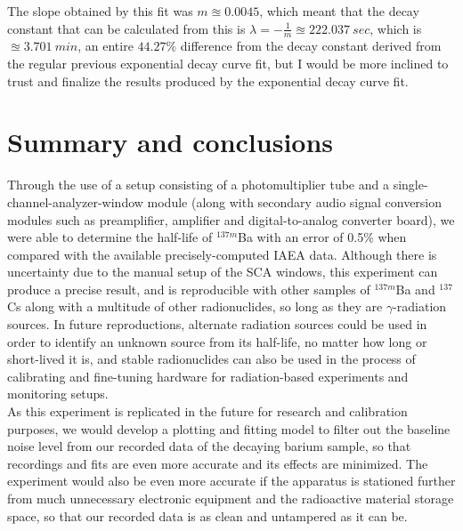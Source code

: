 \documentclass[10pt,letterpaper,onecolumn]{article}
\begin{document}
The slope obtained by this fit was $m \approxeq 0.0045$, which meant that the decay constant that can be calculated from this is $\lambda = -\frac{1}{m} \approxeq 222.037\ sec$, which is $\approxeq 3.701\ min$, an entire $44.27\%$ difference from the decay constant derived from the regular previous exponential decay curve fit, but I would be more inclined to trust and finalize the results produced by the exponential decay curve fit.


\section{Summary and conclusions}

Through the use of a setup consisting of a photomultiplier tube and a single-channel-analyzer-window module (along with secondary audio signal conversion modules such as preamplifier, amplifier and digital-to-analog converter board), we were able to determine the half-life of $^{137m}$Ba with an error of 0.5\% when compared with the available precisely-computed IAEA data. Although there is uncertainty due to the manual setup of the SCA windows, this experiment can produce a precise result, and is reproducible with other samples of $^{137m}$Ba and $^{137}$Cs along with a multitude of other radionuclides, so long as they are $\gamma$-radiation sources. In future reproductions, alternate radiation sources could be used in order to identify an unknown source from its half-life, no matter how long or short-lived it is, and stable radionuclides can also be used in the process of calibrating and fine-tuning hardware for radiation-based experiments and monitoring setups. \\
As this experiment is replicated in the future for research and calibration purposes, we would develop a plotting and fitting model to filter out the baseline noise level from our recorded data of the decaying barium sample, so that recordings and fits are even more accurate and its effects are minimized. The experiment would also be even more accurate if the apparatus is stationed further from much unnecessary electronic equipment and the radioactive material storage space, so that our recorded data is as clean and untampered as it can be.
\end{document}
